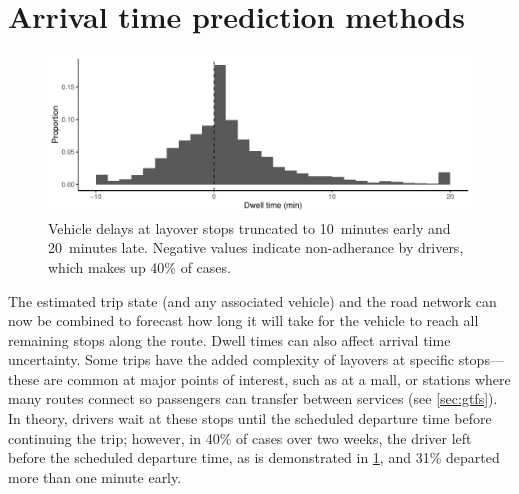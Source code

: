 \section{Arrival time prediction methods}
\label{sec:prediction_arrival_time}




\begin{knitrout}\small
{}\color{fgcolor}\begin{figure}

{\centering \includegraphics[width=\linewidth]{figure/layover_observance-1} 

}

\caption[Vehicle delays at layover stops truncated to 10~minutes early and 20~minutes late]{Vehicle delays at layover stops truncated to 10~minutes early and 20~minutes late. Negative values indicate non-adherance by drivers, which makes up 40\% of cases.}\label{fig:layover_observance}
\end{figure}


\end{knitrout}

The estimated trip state (and any associated vehicle) and the road network can now be combined to forecast how long it will take for the vehicle to reach all remaining stops along the route. Dwell times can also affect arrival time uncertainty. Some trips have the added complexity of layovers at specific stops---these are common at major points of interest, such as at a mall, or stations where many routes connect so passengers can transfer between services (see \cref{sec:gtfs}). In theory, drivers wait at these stops until the scheduled departure time before continuing the trip; however, in 40\% of cases over two weeks, the driver left before the scheduled departure time, as is demonstrated in \cref{fig:layover_observance}, and 31\% departed more than one minute early.


